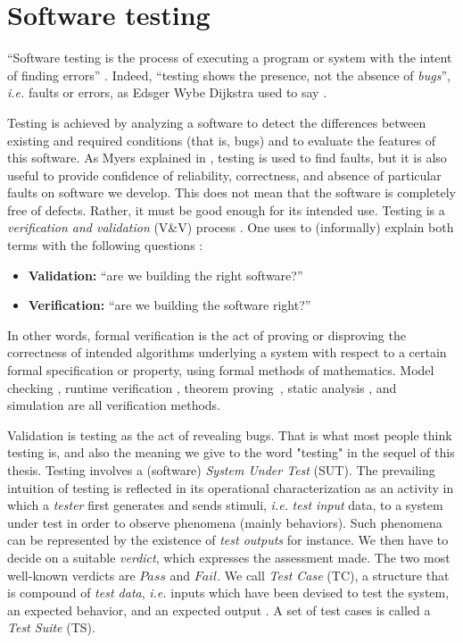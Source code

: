 \section{Software testing}
\label{sec:related:testing}

\enquote{Software testing is the process of executing a program
or system with the intent of finding errors}
\cite{Myers:1979:AST:539883}.  Indeed, \enquote{testing shows the
presence, not the absence of \emph{bugs}}, \emph{i.e.} faults or
errors, as Edsger Wybe Dijkstra used to say
\cite{Buxton:1970:SET:1102021}.

Testing is achieved by analyzing a software to detect the
differences between existing and required conditions (that is,
bugs) and to evaluate the features of this software. As Myers
explained in \cite{Myers:1979:AST:539883}, testing is used to
find faults, but it is also useful to provide confidence of
reliability, correctness, and absence of particular faults on
software we develop. This does not mean that the software is
completely free of defects. Rather, it must be good enough for
its intended use. Testing is a \emph{verification and validation}
(V\&V) process \cite{wallace1989software}. One uses to
(informally) explain both terms with the following questions
\cite{Boehm1979}:

\begin{itemize}
    \item \textbf{Validation:} \enquote{are we building the right
        software?}
    \item \textbf{Verification:} \enquote{are we building the
        software right?}
\end{itemize}

In other words, formal verification is the act of proving or
disproving the correctness of intended algorithms underlying a
system with respect to a certain formal specification or
property, using formal methods of mathematics. Model checking
\cite{clarke1999model}, runtime verification
\cite{Leucker2009293}, theorem proving\ \cite{fitting2012first},
static analysis \cite{lev2000putting}, and simulation are all
verification methods.

Validation is testing as the act of revealing bugs. That is what
most people think testing is, and also the meaning we give to the
word "testing" in the sequel of this thesis. Testing involves a
(software) \textit{System Under Test} (SUT). The prevailing
intuition of testing is reflected in its operational
characterization as an activity in which a \textit{tester} first
generates and sends stimuli, \emph{i.e.} \textit{test input}
data, to a system under test in order to observe phenomena
(mainly behaviors). Such phenomena can be represented by the
existence of \textit{test outputs} for instance. We then have to
decide on a suitable \textit{verdict}, which expresses the
assessment made. The two most well-known verdicts are $Pass$ and
$Fail$. We call \textit{Test Case} (TC), a structure that is
compound of \textit{test data}, \emph{i.e.}  inputs which have
been devised to test the system, an expected behavior, and an
expected output \cite{5733835}. A set of test cases is called a
\textit{Test Suite} (TS).

